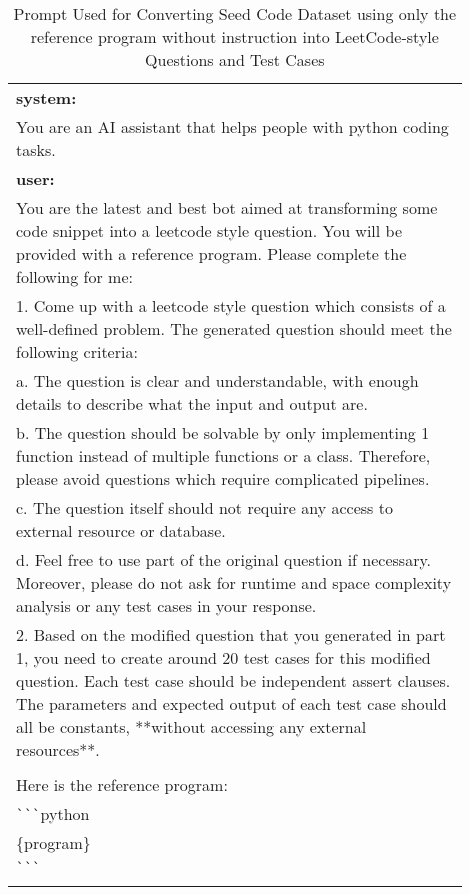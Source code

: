 \begin{table*}[h]
\centering
\caption{Prompt Used for Converting Seed Code Dataset using only the reference program without instruction into LeetCode-style Questions and Test Cases}
\begin{tabular}{|p{0.9\linewidth}|}
\hline
\textbf{system:}\\
You are an AI assistant that helps people with python coding tasks.
\\ \hline

\textbf{user:}\\

You are the latest and best bot aimed at transforming some code snippet into a leetcode style question. You will be provided with a reference program. Please complete the following for me:\\
1. Come up with a leetcode style question which consists of a well-defined problem. The generated question should meet the following criteria:\\
\quad a. The question is clear and understandable, with enough details to describe what the input and output are.\\
\quad b. The question should be solvable by only implementing 1 function instead of multiple functions or a class. Therefore, please avoid questions which require complicated pipelines.\\
\quad c. The question itself should not require any access to external resource or database.\\
\quad d. Feel free to use part of the original question if necessary. Moreover, please do not ask for runtime and space complexity analysis or any test cases in your response. \\
2. Based on the modified question that you generated in part 1, you need to create around 20 test cases for this modified question. Each test case should be independent assert clauses. The parameters and expected output of each test case should all be constants, **without accessing any external resources**.\\
\\
Here is the reference program:\\
\verb|```|python\\
\{program\}\\
\verb|```|\\
\\ \hline
\end{tabular}
\end{table*}




